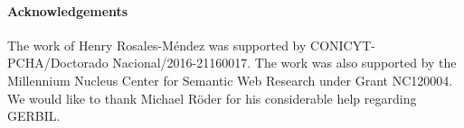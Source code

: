 \documentclass{llncs}
\begin{document}
{\footnotesize
\paragraph{Acknowledgements} The work of Henry Rosales-M\'endez was supported by CONICYT-PCHA/Doctorado Nacional/2016-21160017. The work was also supported by the Millennium Nucleus Center for Semantic Web Research under Grant NC120004. We would like to thank Michael R\"oder for his considerable help regarding GERBIL.}

%
%
%





%
%
%
%
%
%
%
%
%
%
%
\end{document}
